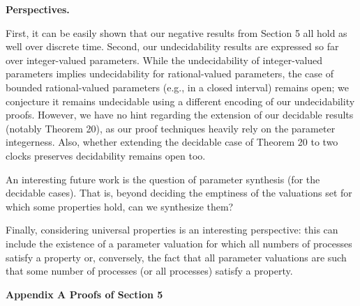  
 
\par\medskip\noindent\textbf{Perspectives.}\par
 
 
First, it can be easily shown that our negative results from Section 5 all hold as well over discrete time. Second, our undecidability results are expressed so far over integer-valued parameters. While the undecidability of integer-valued parameters implies undecidability for rational-valued parameters, the case of bounded rational-valued parameters (e.g., in a closed interval) remains open; we conjecture it remains undecidable using a different encoding of our undecidability proofs. However, we have no hint regarding the extension of our decidable results (notably Theorem 20), as our proof techniques heavily rely on the parameter integerness. Also, whether extending the decidable case of Theorem 20 to two clocks preserves decidability remains open too.\par
 
 
 
An interesting future work is the question of parameter synthesis (for the decidable cases). That is, beyond deciding the emptiness of the valuations set for which some properties hold, can we synthesize them?\par
 
 
 
Finally, considering universal properties is an interesting perspective: this can include the existence of a parameter valuation for which all numbers of processes satisfy a property or, conversely, the fact that all parameter valuations are such that some number of processes (or all processes) satisfy a property.\par
 
 
 


 
\par\medskip\noindent\textbf{Appendix A Proofs of Section 5}\par
 
